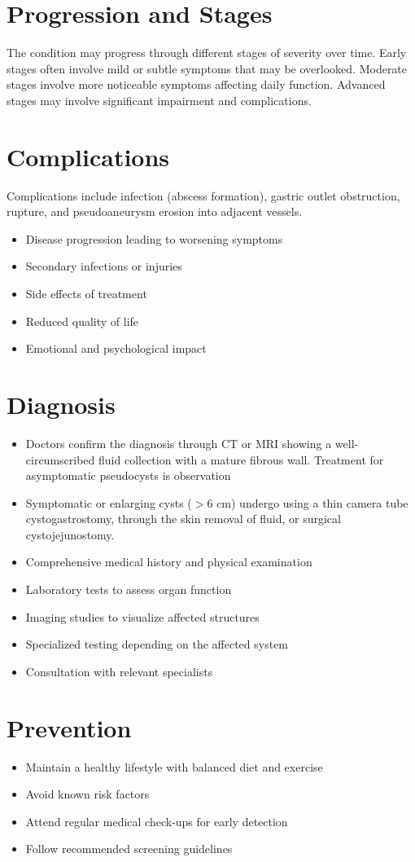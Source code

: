 \section{Progression and Stages}
The condition may progress through different stages of severity over time. Early stages often involve mild or subtle symptoms that may be overlooked. Moderate stages involve more noticeable symptoms affecting daily function. Advanced stages may involve significant impairment and complications.
\section{Complications}
Complications include infection (abscess formation), gastric outlet obstruction, rupture, and pseudoaneurysm erosion into adjacent vessels.

\begin{itemize}[noitemsep]
  \item Disease progression leading to worsening symptoms
  \item Secondary infections or injuries
  \item Side effects of treatment
  \item Reduced quality of life
  \item Emotional and psychological impact
\end{itemize}
\section{Diagnosis}
\begin{itemize}[noitemsep]
  \item Doctors confirm the diagnosis through CT or MRI showing a well-circumscribed fluid collection with a mature fibrous wall. Treatment for asymptomatic pseudocysts is observation
  \item Symptomatic or enlarging cysts ($>6$ cm) undergo using a thin camera tube cystogastrostomy, through the skin removal of fluid, or surgical cystojejunostomy.
  \item Comprehensive medical history and physical examination
  \item Laboratory tests to assess organ function
  \item Imaging studies to visualize affected structures
  \item Specialized testing depending on the affected system
  \item Consultation with relevant specialists
\end{itemize}
\section{Prevention}
\begin{itemize}[noitemsep]
  \item Maintain a healthy lifestyle with balanced diet and exercise
  \item Avoid known risk factors
  \item Attend regular medical check-ups for early detection
  \item Follow recommended screening guidelines
\end{itemize}
